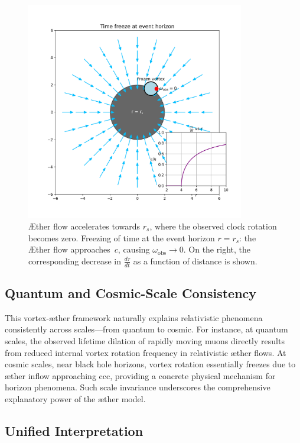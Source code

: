 \begin{figure}[htbp]
    \centering
    \includegraphics[width=0.85\textwidth]{images/10-HorizonTijdsbevriezing}
    \caption{Æther flow accelerates towards $r_s$, where the observed clock rotation becomes zero. Freezing of time at the event horizon $r = r_s$: the Æther flow approaches~$c$, causing $\omega_{\mathrm{obs}} \to 0$. On the right, the corresponding decrease in $\frac{d\tau}{dt}$ as a function of distance is shown.}
    \label{fig:HorizonTijdsbevriezing}
\end{figure}


\subsection*{Quantum and Cosmic-Scale Consistency}

This vortex-æther framework naturally explains relativistic phenomena consistently across scales—from quantum to cosmic. For instance, at quantum scales, the observed lifetime dilation of rapidly moving muons directly results from reduced internal vortex rotation frequency in relativistic æther flows. At cosmic scales, near black hole horizons, vortex rotation essentially freezes due to æther inflow approaching ccc, providing a concrete physical mechanism for horizon phenomena. Such scale invariance underscores the comprehensive explanatory power of the æther model.

\subsection*{Unified Interpretation}

